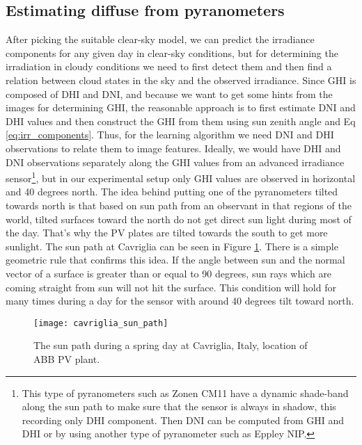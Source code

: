 \subsection{Estimating diffuse from pyranometers}
After picking the suitable clear-sky model, we can predict the irradiance components for any given day in clear-sky conditions, but for determining the irradiation in cloudy conditions we need to first detect them and then find a relation between cloud states in the sky and the observed irradiance. Since GHI is composed of DHI and DNI, and because we want to get some hints from the images for determining GHI, the reasonable approach is to first estimate DNI and DHI values and then construct the GHI from them using sun zenith angle and Eq \ref{eq:irr_components}. Thus, for the learning algorithm we need DNI and DHI observations to relate them to image features. Ideally, we would have DHI and DNI observations separately along the GHI values from an advanced irradiance sensor\footnote{This type of pyranometers such as Zonen CM11 have a dynamic shade-band along the sun path to make sure that the sensor is always in shadow, this recording only DHI component. Then DNI can be computed from GHI and DHI or by using another type of pyranometer such as Eppley NIP.}, but in our experimental setup only GHI values are observed in horizontal and 40 degrees north. The idea behind putting one of the pyranometers tilted towards north is that based on sun path from an observant in that regions of the world, tilted surfaces toward the north do not get direct sun light during most of the day. That's why the PV plates are tilted towards the south to get more sunlight. The sun path at Cavriglia can be seen in Figure \ref{fig:cavriglia_sun_path}. There is a simple geometric rule that confirms this idea. If the angle between sun and the normal vector of a surface is greater than or equal to 90 degrees, sun rays which are coming straight from sun will not hit the surface. This condition will hold for many times during a day for the sensor with around 40 degrees tilt toward north.

\begin{figure}[h]
\caption{The sun path during a spring day at Cavriglia, Italy, location of ABB PV plant.}
\label{fig:cavriglia_sun_path}
\texttt{[image: cavriglia\_sun\_path]}
\centering
\end{figure}

